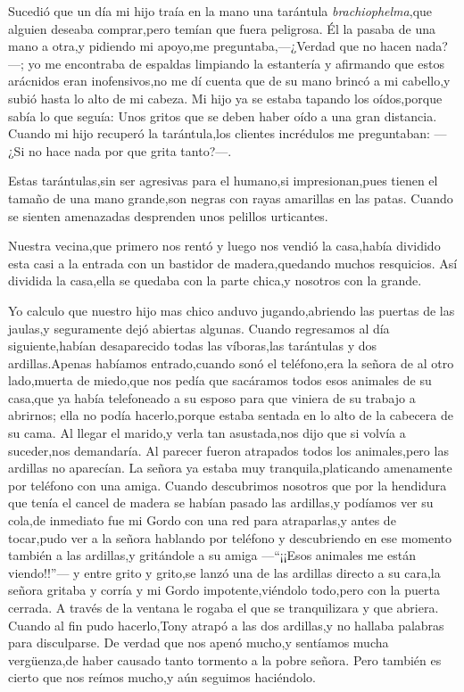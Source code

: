 \documentclass[letterpaper,12pt]{book}
\begin{document}
Sucedió que un día mi hijo traía en la mano una tarántula {\it brachiophelma},que alguien deseaba comprar,pero temían que fuera peligrosa. Él la pasaba de una mano a otra,y pidiendo mi apoyo,me preguntaba,---¿Verdad que no hacen nada?---; yo me encontraba de espaldas limpiando la estantería y afirmando que estos arácnidos eran inofensivos,no me dí cuenta que de su mano brincó a mi cabello,y subió hasta lo alto de mi cabeza. Mi hijo ya se estaba tapando los oídos,porque sabía lo que seguía: Unos gritos que se deben haber oído a una gran distancia. Cuando mi hijo recuperó la tarántula,los clientes incrédulos me preguntaban: ---¿Si no hace nada por que grita tanto?---.

Estas tarántulas,sin ser agresivas para el humano,si impresionan,pues tienen el tamaño de una mano grande,son negras con rayas amarillas en las patas. Cuando se sienten amenazadas desprenden unos pelillos urticantes.

Nuestra vecina,que primero nos rentó y luego nos vendió la casa,había dividido esta casi a la entrada con un bastidor de madera,quedando muchos resquicios. Así dividida la  casa,ella se quedaba con la parte chica,y nosotros con la grande.

Yo calculo que nuestro hijo mas chico anduvo jugando,abriendo las puertas de las jaulas,y seguramente dejó abiertas algunas. Cuando regresamos al día siguiente,habían desaparecido todas las víboras,las tarántulas y dos ardillas.Apenas habíamos entrado,cuando sonó el teléfono,era la señora de al otro lado,muerta de miedo,que nos pedía que sacáramos todos esos animales de su casa,que ya había telefoneado a su esposo para que viniera de su trabajo a abrirnos; ella no podía hacerlo,porque estaba sentada en lo alto de la cabecera de su cama. Al llegar el marido,y verla tan asustada,nos dijo que si volvía a suceder,nos demandaría. Al parecer fueron atrapados todos los animales,pero las ardillas no aparecían. La señora ya estaba muy tranquila,platicando amenamente  por teléfono con una amiga. Cuando descubrimos nosotros que por la hendidura que tenía el cancel de madera se habían pasado las ardillas,y podíamos ver su cola,de inmediato fue mi Gordo con una red para atraparlas,y antes de tocar,pudo ver a la señora hablando por teléfono y descubriendo en ese momento también a las ardillas,y gritándole a su amiga ---``¡¡Esos animales me están viendo!!''--- y entre grito y grito,se lanzó una de las ardillas directo a su cara,la señora gritaba y corría y mi Gordo impotente,viéndolo todo,pero con la puerta cerrada. A través de la ventana le rogaba el que se tranquilizara y que abriera. Cuando al fin pudo hacerlo,Tony atrapó a las dos ardillas,y no hallaba palabras para disculparse. De verdad que nos apenó mucho,y sentíamos mucha vergüenza,de haber causado tanto tormento a la pobre señora. Pero también  es cierto que nos reímos mucho,y aún seguimos haciéndolo.
\end{document}
